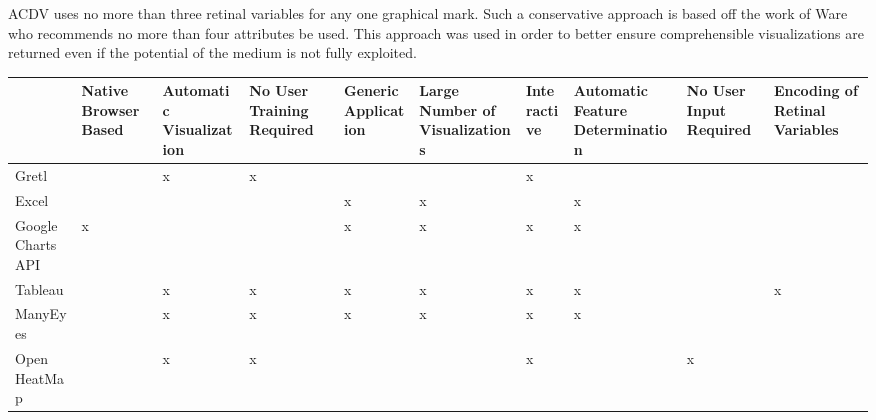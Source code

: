 \documentclass[a4paper, 11pt, titlepage, onehalfspacing]{report}
\begin{document}
AC\lightning{}DV uses no more than three retinal variables for any one graphical mark. Such a conservative approach is based off the work of Ware \cite{ware2012information} who recommends no more than four attributes be used. This approach was used in order to better ensure comprehensible visualizations are returned even if the potential of the medium is not fully exploited. 
\begin{sidewaystable}
    \small
    \begin{tabularx}{\textwidth}{>{\centering}X|>{\centering}X|>{\centering}X|>{\centering}X|>{\centering}X|>{\centering}X|>{\centering}X|>{\centering}X|>{\centering}X|>{\centering\arraybackslash}X}
    ~                 & Native Browser Based & Automatic Visualization & No User Training Required & Generic Application & Large Number of Visualizations & Interactive & Automatic Feature Determination & No User Input Required & Encoding of Retinal Variables \\ \hline
    Gretl             & ~                    & x                       & x                         & ~                   & ~                              & x           & ~                               & ~                      & ~                             \\ \hline
    Excel             & ~                    & ~                       & ~                         & x                   & x                              & ~           & x                               & ~                      & ~                             \\ \hline
    Google Charts API & x                    & ~                       & ~                         & x                   & x                              & x           & x                               & ~                      & ~                             \\ \hline
    Tableau           & ~                    & x                       & x                         & x                   & x                              & x           & x                               & ~                      & x                             \\ \hline
    ManyEyes          & ~                    & x                       & x                         & x                   & x                              & x           & x                               & ~                      & ~                             \\ \hline
    Open HeatMap       & ~                    & x                       & x                         & ~                   & ~                              & x           & ~                               & x                      & ~                             \\ \hline

\end{tabularx}
\end{sidewaystable}
\end{document}
